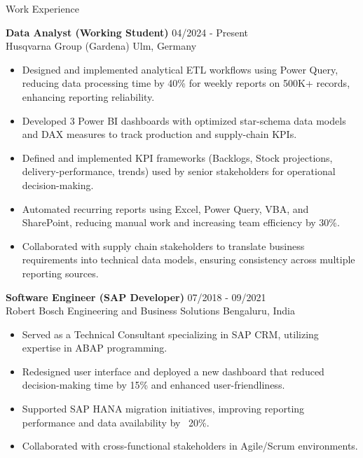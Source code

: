 \documentclass{resume} %
\begin{document}
\begin{rSection}{Work Experience}
\vspace{-0.5em} %

\item \textbf{Data Analyst (Working Student)} \hfill 04/2024 - Present \\
{Husqvarna Group (Gardena)} \hfill Ulm, Germany
\begin{itemize}
     \item Designed and implemented analytical ETL workflows using Power Query, reducing data processing time by 40\% for weekly reports on 500K+ records, enhancing reporting reliability.
     \item Developed 3 Power BI dashboards with optimized star-schema data models and DAX measures to track production and supply-chain KPIs.
     \item Defined and implemented KPI frameworks (Backlogs, Stock projections, delivery-performance, trends) used by senior stakeholders for operational decision-making.
     \item Automated recurring reports using Excel, Power Query, VBA, and SharePoint, reducing manual work and increasing team efficiency by 30\%.
     \item Collaborated with supply chain stakeholders to translate business requirements into technical data models, ensuring consistency across multiple reporting sources.
\end{itemize}

\vspace{0.3cm}

\item \textbf{Software Engineer (SAP Developer)} \hfill 07/2018 - 09/2021 \\
{Robert Bosch Engineering and Business Solutions} \hfill Bengaluru, India
\begin{itemize}
     \item Served as a Technical Consultant specializing in SAP CRM, utilizing expertise in ABAP programming.
     \item Redesigned user interface and deployed a new dashboard that reduced decision-making time by 15\% and enhanced user-friendliness.
     \item Supported SAP HANA migration initiatives, improving reporting performance and data availability by ~20\%.
     \item Collaborated with cross-functional stakeholders in Agile/Scrum environments.
\end{itemize}
\end{rSection}
\end{document}
